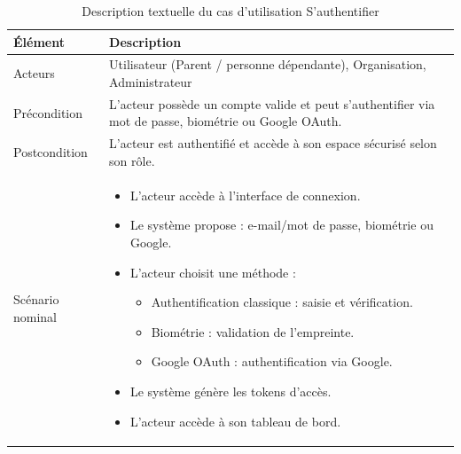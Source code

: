 \small
\renewcommand{\arraystretch}{1.1}
\setlength{\parskip}{0pt}
\begin{longtable}{|p{}|>{\raggedright\arraybackslash}p{}|}
\caption{Description textuelle du cas d'utilisation S'authentifier} \\
\hline
\textbf{Élément} & \textbf{Description} \\ \hline
\endfirsthead

\endhead

\hline
\endlastfoot

Acteurs & Utilisateur (Parent / personne dépendante), Organisation, Administrateur \\ \hline

Précondition & L'acteur possède un compte valide et peut s'authentifier via mot de passe, biométrie ou Google OAuth. \\ \hline

Postcondition & L'acteur est authentifié et accède à son espace sécurisé selon son rôle. \\ \hline

Scénario nominal &
\begin{itemize}[nosep, leftmargin=*]
\item L'acteur accède à l'interface de connexion.
\item Le système propose : e-mail/mot de passe, biométrie ou Google.
\item L'acteur choisit une méthode :
\begin{itemize}[nosep, leftmargin=*]
\item Authentification classique : saisie et vérification.
\item Biométrie : validation de l'empreinte.
\item Google OAuth : authentification via Google.
\end{itemize}
\item Le système génère les tokens d'accès.
\item L'acteur accède à son tableau de bord.
\end{itemize}
\\ \hline


\end{longtable}

